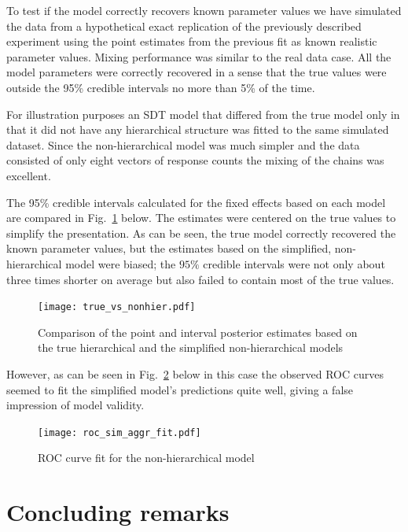 \documentclass[oneside,a4paper]{article}
\begin{document}
To test if the model correctly recovers known parameter values we have
simulated the data from a hypothetical exact replication of the
previously described experiment using the point estimates from the
previous fit as known realistic parameter values. Mixing performance
was similar to the real data case. All the model parameters were
correctly recovered in a sense that the true values were outside the
95\% credible intervals no more than 5\% of the time.

For illustration purposes an SDT model that differed from the true
model only in that it did not have any hierarchical structure was
fitted to the same simulated dataset. Since the non-hierarchical model
was much simpler and the data consisted of only eight vectors of
response counts the mixing of the chains was excellent.

The 95\% credible intervals calculated for the fixed effects based on
each model are compared in Fig.~\ref{fig:5} below. The estimates were
centered on the true values to simplify the presentation. As can be
seen, the true model correctly recovered the known parameter values,
but the estimates based on the simplified, non-hierarchical model were
biased; the $95\%$ credible intervals were not only about three times
shorter on average but also failed to contain most of the true values.

\begin{figure}[H]
  \centering
  \texttt{[image: true\_vs\_nonhier.pdf]}
  \caption{Comparison of the point and interval posterior estimates
    based on the true hierarchical and the simplified non-hierarchical
    models}
  \label{fig:5}
\end{figure}

However, as can be seen in Fig.~\ref{fig:8} below in this case the
observed ROC curves seemed to fit the simplified model's predictions
quite well, giving a false impression of model validity.

\begin{figure}[H]
  \centering
  \texttt{[image: roc\_sim\_aggr\_fit.pdf]}
  \caption{ROC curve fit for the non-hierarchical model}
  \label{fig:8}
\end{figure}

\section{Concluding remarks}
\end{document}
